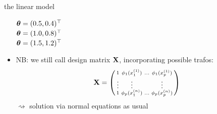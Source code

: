 \documentclass[11pt,compress,t,notes=noshow, xcolor=table]{beamer}
\begin{document}
\begin{vbframe}{the linear model}
\begin{itemize}
\begin{minipage}[b]{0.2\textwidth}
  \tiny \raggedleft
  \textcolor{blue}{$\bm{\theta} = (0.5, 0.4)^\top$} \\
  \textcolor{orange}{$\bm{\theta} = (1.0, 0.8)^\top$} \\
  \textcolor{magenta}{$\bm{\theta} = (1.5, 1.2)^\top$} \\
  \vspace{0.1cm}
\end{minipage}

\vfill

\item NB: we still call design matrix $\mathbf{X}$, incorporating possible trafos:
\begin{align*}
  \mathbf{X} = 
  \left(
    \begin{smallmatrix}
        1 & \textcolor{black}{\phi_1} (x^{(1)}_1) & \ldots & 
        \textcolor{black}{\phi_1} (x^{(1)}_p) \\
        \vdots & \vdots & & \vdots \\
        1 & \textcolor{black}{\phi_p} (x^{(n)}_1) & \ldots & 
        \textcolor{black}{\phi_p} (x^{(n)}_p) \\
    \end{smallmatrix}
    \right)
\end{align*}
$\rightsquigarrow$ solution via normal equations as usual
\end{itemize}

\end{vbframe}

\end{document}
